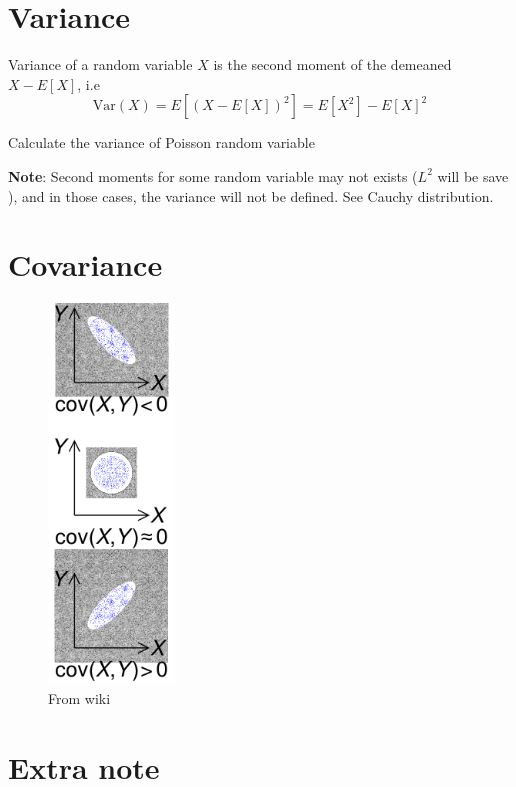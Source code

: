 \section{Variance}
Variance of a random variable \(X\) is the second moment of the demeaned \(X-E[X]\), i.e
\[
    \text{Var} (X) = E[(X-E[X])^2] = E[X^2] - E[X]^2
\]
\begin{eg}
    Calculate the variance of Poisson random variable
\end{eg}
\textbf{Note}: Second moments for some random variable may not exists (\(L^2\) will be save ), and in those cases, the variance will not be defined. See Cauchy distribution.
\section{Covariance}
\begin{figure}[h]
    \centering
    \includegraphics[width=0.3\textwidth]{./Figures/Covariance_trends.png}
    \caption{From wiki}
\end{figure}


\section{Extra note}


